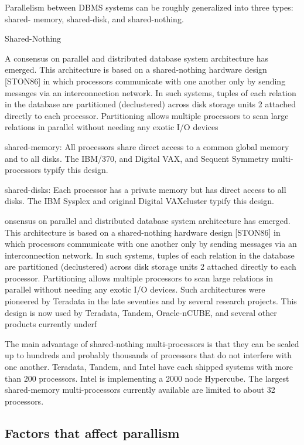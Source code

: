 \documentclass[10pt,twocolumn]{IEEEtran11}
\begin{document}
Parallelism between DBMS systems can be roughly generalized into three types: shared- memory, shared-disk, and shared-nothing.




Shared-Nothing

A consensus on parallel and distributed database system architecture has emerged. This
architecture is based on a shared-nothing hardware design [STON86] in which processors
communicate with one another only by sending messages via an interconnection network. In
such systems, tuples of each relation in the database are partitioned (declustered) across disk
storage units
2 attached directly to each processor. Partitioning allows multiple processors to scan
large relations in parallel without needing any exotic I/O devices


shared-memory: All processors share direct access to a common global memory and to all
disks. The IBM/370, and Digital VAX, and Sequent Symmetry multi-processors typify this
design.

shared-disks: Each processor has a private memory but has direct access to all disks. The IBM
Sysplex and original Digital VAXcluster typify this design.



onsensus on parallel and distributed database system architecture has emerged. This
architecture is based on a shared-nothing hardware design [STON86] in which processors
communicate with one another only by sending messages via an interconnection network. In
such systems, tuples of each relation in the database are partitioned (declustered) across disk
storage units
2 attached directly to each processor. Partitioning allows multiple processors to scan
large relations in parallel without needing any exotic I/O devices. Such architectures were
pioneered by Teradata in the late seventies and by several research projects. This design is now
used by Teradata, Tandem, Oracle-nCUBE, and several other products currently underf


The main advantage of shared-nothing multi-processors is that they can be scaled up to
hundreds and probably thousands of processors that do not interfere with one another. Teradata,
Tandem, and Intel have each shipped systems with more than 200 processors. Intel is
implementing a 2000 node Hypercube. The largest shared-memory multi-processors currently
available are limited to about 32 processors.

\subsection{Factors that affect parallism}
\end{document}
